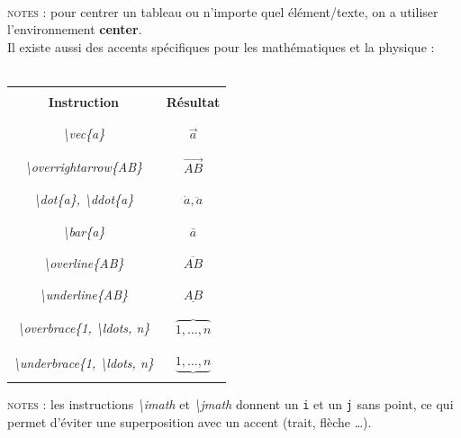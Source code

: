 \documentclass[a4paper, 10pt]{book}
\begin{document}
\textsc{\\notes :} pour centrer un tableau ou n'importe quel élément/texte, on a utiliser l'environnement \textbf{center}.\\


Il existe aussi des accents spécifiques pour les mathématiques et la physique : \\ \\

\begin{center}
\begin{tabular}{|c|c|}
\hline \\
\textbf{Instruction} & \textbf{Résultat} \\ \\
\hline \hline \\
\textit{\textbackslash vec\{a\}} & $ \vec{a} $ \\ \\
\hline \\
\textit{\textbackslash overrightarrow\{AB\}} & $ \overrightarrow{AB} $ \\ \\
\hline  \\
\textit{\textbackslash dot\{a\}, \textbackslash ddot\{a\}} & $  \dot{a}, \ddot{a} $ \\ \\
\hline \\
\textit{\textbackslash bar\{a\}} & $ \bar{a} $ \\ \\
\hline \\
\textit{\textbackslash overline\{AB\}} & $ \overline{AB} $ \\ \\
\hline \\
\textit{\textbackslash underline\{AB\}} & $ \underline{AB} $ \\ \\
\hline \\
\textit{\textbackslash overbrace\{1, \textbackslash ldots, n\}} & $ \overbrace{1, \ldots, n} $ \\ \\
\hline \\
\textit{\textbackslash underbrace\{1, \textbackslash ldots, n\}} & $ \underbrace{1, \ldots, n} $ \\ \\
\hline
\end{tabular}
\end{center}

\textsc{notes :} les instructions \textit{\textbackslash imath} et \textit{\textbackslash jmath} donnent un \texttt{i} et un \texttt{j} sans point, ce qui permet d'éviter une superposition avec un accent (trait, flèche \ldots).	
\end{document}
